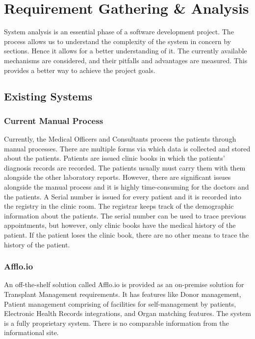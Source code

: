 \documentclass[12pt,a4paper]{report}
\begin{document}
\newpage
\chapter{Requirement Gathering \& Analysis}

System analysis is an essential phase of a software development project. The process allows us to understand the complexity of the system in concern by sections. Hence it allows for a better understanding of it.  The currently available mechanisms are considered, and their pitfalls and advantages are measured. This provides a better way to achieve the project goals.

\section{Existing Systems}
\subsection{Current Manual Process}

Currently, the Medical Officers and Consultants process the patients through manual processes. There are multiple forms via which data is collected and stored about the patients. 
Patients are issued clinic books in which the patients’ diagnosis records are recorded. The patients usually must carry them with them alongside the other laboratory reports. However, there are significant issues alongside the manual process and it is highly time-consuming for the doctors and the patients. A Serial number is issued for every patient and it is recorded into the registry in the clinic room. The registrar keeps track of the demographic information about the patients. The serial number can be used to trace previous appointments, but however, only clinic books have the medical history of the patient. If the patient loses the clinic book, there are no other means to trace the history of the patient. 

\subsection{Afflo.io}
An off-the-shelf solution called Afflo.io is provided as an on-premise solution for Transplant Management requirements. It has features like Donor management, Patient management comprising of facilities for self-management by patients, Electronic Health Records integrations, and Organ matching features. The system is a fully proprietary system. There is no comparable information from the informational site.  \cite{afflo}
\end{document}
